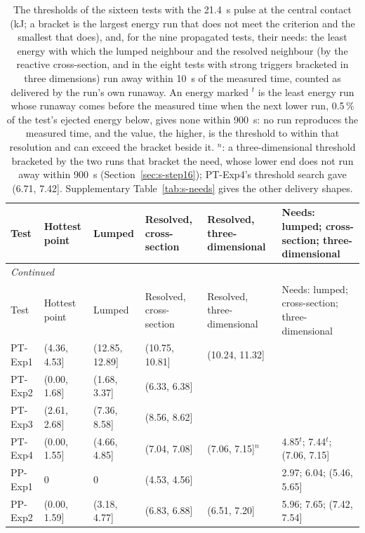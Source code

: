 {\footnotesize\setlength{\tabcolsep}{3pt}
\begin{longtable}{p{}p{}p{}p{}p{}p{}}
\caption{The thresholds of the sixteen tests with the 21.4~s pulse at the central contact (kJ; a bracket is the largest energy run that does not meet the criterion and the smallest that does), and, for the nine propagated tests, their needs: the least energy with which the lumped neighbour and the resolved neighbour (by the reactive cross-section, and in the eight tests with strong triggers bracketed in three dimensions) run away within 10~s of the measured time, counted as delivered by the run's own runaway. An energy marked $^{t}$ is the least energy run whose runaway comes before the measured time when the next lower run, 0.5\,\% of the test's ejected energy below, gives none within 900~s: no run reproduces the measured time, and the value, the higher, is the threshold to within that resolution and can exceed the bracket beside it. $^{n}$: a three-dimensional threshold bracketed by the two runs that bracket the need, whose lower end does not run away within 900~s (Section~\ref{sec:s-step16}); PT-Exp4's threshold search gave (6.71, 7.42]. Supplementary Table~\ref{tab:s-needs} gives the other delivery shapes.}\label{tab:s-thresholds}\\
\toprule
Test & Hottest point & Lumped & Resolved, cross-section & Resolved, three-dimensional & Needs: lumped; cross-section; three-dimensional \\
\midrule
\endfirsthead
\multicolumn{6}{l}{\textit{Continued}} \\
\toprule
Test & Hottest point & Lumped & Resolved, cross-section & Resolved, three-dimensional & Needs: lumped; cross-section; three-dimensional \\
\midrule
\endhead
PT-Exp1 & (4.36, 4.53] & (12.85, 12.89] & (10.75, 10.81] & (10.24, 11.32] &  \\
PT-Exp2 & (0.00, 1.68] & (1.68, 3.37] & (6.33, 6.38] &  &  \\
PT-Exp3 & (2.61, 2.68] & (7.36, 8.58] & (8.56, 8.62] &  &  \\
PT-Exp4 & (0.00, 1.55] & (4.66, 4.85] & (7.04, 7.08] & (7.06, 7.15]$^{n}$ & 4.85$^{t}$; 7.44$^{t}$; (7.06, 7.15] \\
PP-Exp1 & 0 & 0 & (4.53, 4.56] &  & 2.97; 6.04; (5.46, 5.65] \\
PP-Exp2 & (0.00, 1.59] & (3.18, 4.77] & (6.83, 6.88] & (6.51, 7.20] & 5.96; 7.65; (7.42, 7.54] \\

\end{longtable}}
